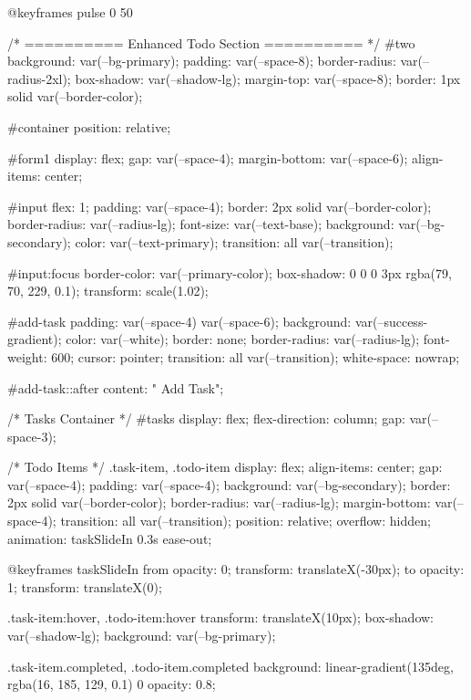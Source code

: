 @keyframes pulse {
  0%
  50%
}

/* ========== Enhanced Todo Section ========== */
#two {
  background: var(--bg-primary);
  padding: var(--space-8);
  border-radius: var(--radius-2xl);
  box-shadow: var(--shadow-lg);
  margin-top: var(--space-8);
  border: 1px solid var(--border-color);
}

#container {
  position: relative;
}

#form1 {
  display: flex;
  gap: var(--space-4);
  margin-bottom: var(--space-6);
  align-items: center;
}

#input {
  flex: 1;
  padding: var(--space-4);
  border: 2px solid var(--border-color);
  border-radius: var(--radius-lg);
  font-size: var(--text-base);
  background: var(--bg-secondary);
  color: var(--text-primary);
  transition: all var(--transition);
}

#input:focus {
  border-color: var(--primary-color);
  box-shadow: 0 0 0 3px rgba(79, 70, 229, 0.1);
  transform: scale(1.02);
}

#add-task {
  padding: var(--space-4) var(--space-6);
  background: var(--success-gradient);
  color: var(--white);
  border: none;
  border-radius: var(--radius-lg);
  font-weight: 600;
  cursor: pointer;
  transition: all var(--transition);
  white-space: nowrap;
}

#add-task::after {
  content: " Add Task";
}

/* Tasks Container */
#tasks {
  display: flex;
  flex-direction: column;
  gap: var(--space-3);
}

/* Todo Items */
.task-item, .todo-item {
  display: flex;
  align-items: center;
  gap: var(--space-4);
  padding: var(--space-4);
  background: var(--bg-secondary);
  border: 2px solid var(--border-color);
  border-radius: var(--radius-lg);
  margin-bottom: var(--space-4);
  transition: all var(--transition);
  position: relative;
  overflow: hidden;
  animation: taskSlideIn 0.3s ease-out;
}

@keyframes taskSlideIn {
  from {
    opacity: 0;
    transform: translateX(-30px);
  }
  to {
    opacity: 1;
    transform: translateX(0);
  }
}

.task-item:hover, .todo-item:hover {
  transform: translateX(10px);
  box-shadow: var(--shadow-lg);
  background: var(--bg-primary);
}

.task-item.completed, .todo-item.completed {
  background: linear-gradient(135deg, rgba(16, 185, 129, 0.1) 0%
  opacity: 0.8;
}

